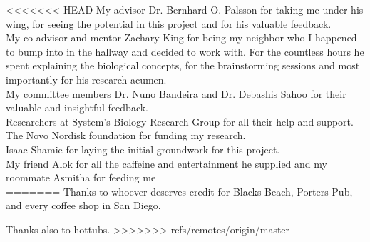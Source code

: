 \begin{frontmatter}
%
\tableofcontents
\listoffigures  %
\listoftables   %



%
%
\begin{acknowledgements}
<<<<<<< HEAD
 My advisor Dr. Bernhard O. Palsson for taking me under his wing, for seeing the potential in this project and for his valuable feedback.  \\
 My co-advisor and mentor Zachary King for being my neighbor who I happened to bump into in the hallway and decided to work with. For the countless hours he spent explaining the biological concepts, for the brainstorming sessions and most importantly for his research acumen.\\
 My committee members Dr. Nuno Bandeira and Dr. Debashis Sahoo for their valuable and insightful feedback.\\ 
 Researchers at System's Biology Research Group for all their help and support.\\
 The Novo Nordisk foundation for funding my research. \\
 Isaac Shamie for laying the initial groundwork for this project.\\
 My friend Alok for all the caffeine and entertainment he supplied and my roommate Asmitha for feeding me\\
 
=======
 Thanks to whoever deserves credit for Blacks Beach, Porters Pub, and
 every coffee shop in San Diego.

 Thanks also to hottubs.
>>>>>>> refs/remotes/origin/master
\end{acknowledgements}



\end{frontmatter}
